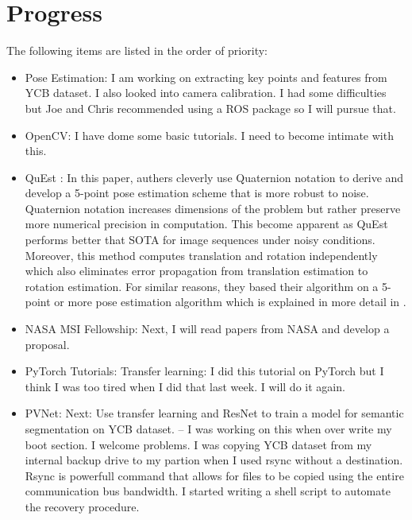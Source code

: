 \documentclass[11pt]{article}
\begin{document}
\section{Progress}
The following items are listed in the order of priority:
\begin{itemize}
      \item Pose Estimation: I am working on extracting key points and features
      from YCB dataset. I also looked into camera calibration. I had some difficulties
      but Joe and Chris recommended using a ROS package so I will pursue that.

      \item OpenCV: I have dome some basic tutorials. I need to become intimate
      with this.

      \item QuEst \cite{QuEst}: In this paper, authers cleverly use Quaternion notation
      to derive and develop a 5-point pose estimation scheme that is more robust to noise.
      Quaternion notation increases dimensions of the problem but rather preserve
      more numerical precision in computation. This become apparent as QuEst
      performs better that SOTA for image sequences under noisy conditions.
      Moreover, this method computes translation and rotation independently which
      also eliminates error propagation from translation estimation to rotation
      estimation. For similar reasons, they based their algorithm on a 5-point
      or more pose estimation algorithm which is explained in more detail in
      \cite{ma2012invitation}.

      \item NASA MSI Fellowship: Next, I will read papers from NASA
      \cite{NASATech44:online} and develop a proposal.

      \item PyTorch Tutorials: Transfer learning: I did this tutorial on PyTorch
      but I think I was too tired when I did that last week. I will do it again.

      \item PVNet: Next: Use transfer learning and ResNet to train a model for
      semantic segmentation on YCB dataset. -- I was working on this when over
      write my boot section. I welcome problems. I was copying YCB dataset from
      my internal backup drive to my partion when I used rsync without a
      destination. Rsync is powerfull command that allows for files to be copied
      using the entire communication bus bandwidth. I started writing a shell
      script to automate the recovery procedure.


\end{itemize}
\end{document}

